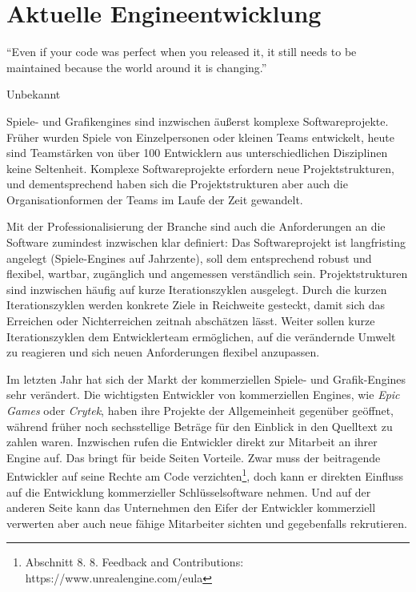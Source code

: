\chapter{Aktuelle Engineentwicklung}
\label{chap:engine-uebersicht}

\epigraph{"`Even if your code was perfect when you released it, it still needs to be maintained because the world around it is changing."'}{Unbekannt}

Spiele- und Grafikengines sind inzwischen äußerst komplexe Softwareprojekte. Früher wurden Spiele von Einzelpersonen oder kleinen Teams entwickelt, heute sind Teamstärken von über 100 Entwicklern aus unterschiedlichen Disziplinen keine Seltenheit. Komplexe Softwareprojekte erfordern neue Projektstrukturen, und dementsprechend haben sich die Projektstrukturen aber auch die Organisationformen der Teams im Laufe der Zeit gewandelt.

Mit der Professionalisierung der Branche sind auch die Anforderungen an die Software zumindest inzwischen klar definiert: Das Softwareprojekt ist langfristing angelegt (Spiele-Engines auf Jahrzente), soll dem entsprechend robust und flexibel, wartbar, zugänglich und angemessen verständlich sein. Projektstrukturen sind inzwischen häufig auf kurze Iterationszyklen ausgelegt. Durch die kurzen Iterationszyklen werden konkrete Ziele in Reichweite gesteckt, damit sich das Erreichen oder Nichterreichen zeitnah abschätzen lässt. Weiter sollen kurze Iterationszyklen dem Entwicklerteam ermöglichen, auf die verändernde Umwelt zu reagieren und sich neuen Anforderungen flexibel anzupassen.

Im letzten Jahr hat sich der Markt der kommerziellen Spiele- und Grafik-Engines sehr verändert. Die wichtigsten Entwickler von kommerziellen Engines, wie \textit{Epic Games} oder \textit{Crytek}, haben ihre Projekte der Allgemeinheit gegenüber geöffnet, während früher noch sechsstellige Beträge für den Einblick in den Quelltext zu zahlen waren. Inzwischen rufen die Entwickler direkt zur Mitarbeit an ihrer Engine auf. Das bringt für beide Seiten Vorteile. Zwar muss der beitragende Entwickler auf seine Rechte am Code verzichten\footnote{Abschnitt 8. 8. Feedback and Contributions: https://www.unrealengine.com/eula}, doch kann er direkten Einfluss auf die Entwicklung kommerzieller Schlüsselsoftware nehmen. Und auf der anderen Seite kann das Unternehmen den Eifer der Entwickler kommerziell verwerten aber auch neue fähige Mitarbeiter sichten und gegebenfalls rekrutieren.

